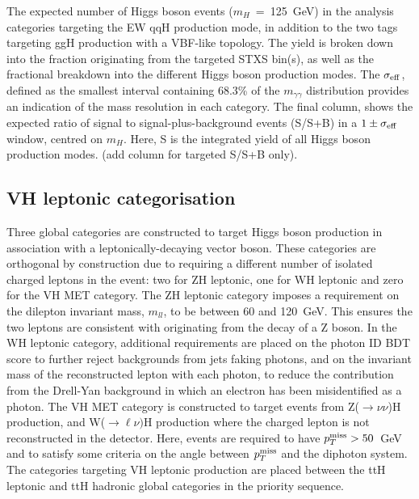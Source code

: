 \begin{table}[htb]
    \caption[Expected yields for the qqH production mode categories]{The expected number of Higgs boson events ($m_H$~=~125~GeV) in the analysis categories targeting the EW qqH production mode, in addition to the two tags targeting ggH production with a VBF-like topology. The yield is broken down into the fraction originating from the targeted STXS bin(s), as well as the fractional breakdown into the different Higgs boson production modes. The $\sigma_{\rm{eff}}$, defined as the smallest interval containing 68.3\% of the $m_{\gamma\gamma}$ distribution provides an indication of the mass resolution in each category. The final column, shows the expected ratio of signal to signal-plus-background events (S/S+B) in a $1\pm\sigma_{\rm{eff}}$ window, centred on $m_H$. Here, S is the integrated yield of all Higgs boson production modes. (add column for targeted S/S+B only).}
    \label{tab:qqH_category_yields}
    \centering
    \scriptsize
    \renewcommand{\arraystretch}{1.3}
    \setlength{\tabcolsep}{2pt}
    
\end{table}

\FloatBarrier

\subsection{VH leptonic categorisation}
Three global categories are constructed to target Higgs boson production in association with a leptonically-decaying vector boson. These categories are orthogonal by construction due to requiring a different number of isolated charged leptons in the event: two for ZH leptonic, one for WH leptonic and zero for the VH MET category. The ZH leptonic category imposes a requirement on the dilepton invariant mass, $m_{ll}$, to be between 60 and 120~GeV. This ensures the two leptons are consistent with originating from the decay of a Z boson. In the WH leptonic category, additional requirements are placed on the photon ID BDT score to further reject backgrounds from jets faking photons, and on the invariant mass of the reconstructed lepton with each photon, to reduce the contribution from the Drell-Yan background in which an electron has been misidentified as a photon. The VH MET category is constructed to target events from Z($\rightarrow\nu\nu$)H production, and W($\rightarrow\ell\nu)$H production where the charged lepton is not reconstructed in the detector. Here, events are required to have $p_T^{\rm{miss}}>50$~GeV and to satisfy some criteria on the angle between $p_T^{\rm{miss}}$ and the diphoton system. The categories targeting VH leptonic production are placed between the ttH leptonic and ttH hadronic global categories in the priority sequence.

